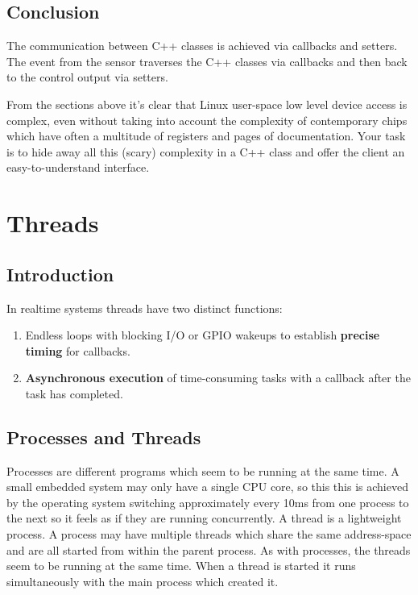\documentclass[12pt]{report}
\begin{document}
\section{Conclusion}
The communication between C++ classes is achieved via
callbacks and setters. The event from the sensor traverses
the C++ classes via callbacks and then back to the control
output via setters.

From the sections above it's clear that Linux user-space low level
device access is complex, even without taking into account the
complexity of contemporary chips which have often a multitude of
registers and pages of documentation. Your task is to hide away
all this (scary) complexity in a C++ class and offer the client
an easy-to-understand interface.





\chapter{Threads}

\section{Introduction}
In realtime systems threads have two distinct functions:
\begin{enumerate}
\item Endless loops with blocking I/O or GPIO wakeups
  to establish \textbf{precise timing} for callbacks.
\item \textbf{Asynchronous execution} of time-consuming tasks
  with a callback after the task has completed.
\end{enumerate}


\section{Processes and Threads}
Processes are different programs which seem to be running at the same
time. A small embedded system may only have a single CPU core,
so this this is achieved by the operating system switching
approximately every 10ms from one process to the next so it feels as
if they are running concurrently. A thread is a lightweight
process. A process may have  multiple threads which share the same
address-space and are all started from
within the parent process. As with processes, the threads seem to be
running at the same time. When a thread is started it runs
simultaneously with the main process which created it.
\end{document}
